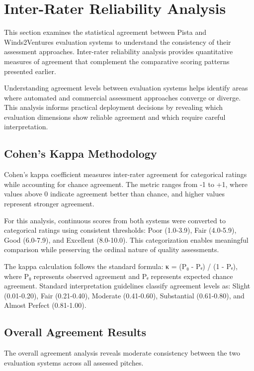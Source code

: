 \section{Inter-Rater Reliability Analysis}
\label{sec:inter-rater-reliability}

This section examines the statistical agreement between Pista and Winds2Ventures evaluation systems to understand the consistency of their assessment approaches. Inter-rater reliability analysis provides quantitative measures of agreement that complement the comparative scoring patterns presented earlier.

Understanding agreement levels between evaluation systems helps identify areas where automated and commercial assessment approaches converge or diverge. This analysis informs practical deployment decisions by revealing which evaluation dimensions show reliable agreement and which require careful interpretation.

\subsection{Cohen's Kappa Methodology}
\label{subsec:kappa-methodology}

Cohen's kappa coefficient measures inter-rater agreement for categorical ratings while accounting for chance agreement. The metric ranges from -1 to +1, where values above 0 indicate agreement better than chance, and higher values represent stronger agreement.

For this analysis, continuous scores from both systems were converted to categorical ratings using consistent thresholds: Poor (1.0-3.9), Fair (4.0-5.9), Good (6.0-7.9), and Excellent (8.0-10.0). This categorization enables meaningful comparison while preserving the ordinal nature of quality assessments.

The kappa calculation follows the standard formula: κ = (P₀ - Pₑ) / (1 - Pₑ), where P₀ represents observed agreement and Pₑ represents expected chance agreement. Standard interpretation guidelines classify agreement levels as: Slight (0.01-0.20), Fair (0.21-0.40), Moderate (0.41-0.60), Substantial (0.61-0.80), and Almost Perfect (0.81-1.00).

\subsection{Overall Agreement Results}
\label{subsec:overall-agreement}

The overall agreement analysis reveals moderate consistency between the two evaluation systems across all assessed pitches.

